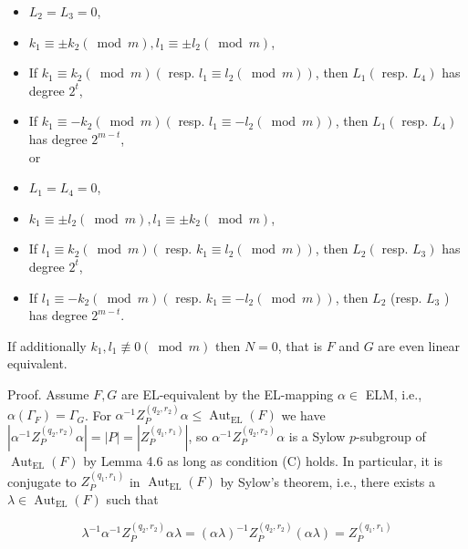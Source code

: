 \documentclass[10pt]{article}
\begin{document}
\begin{itemize}
  \item $L_{2}=L_{3}=0$,
  \item $k_{1} \equiv \pm k_{2}(\bmod m), l_{1} \equiv \pm l_{2}(\bmod m)$,
  \item If $k_{1} \equiv k_{2}(\bmod m)\left(\right.$ resp. $\left.l_{1} \equiv l_{2}(\bmod m)\right)$, then $L_{1}\left(\right.$ resp. $\left.L_{4}\right)$ has degree $2^{t}$,
  \item If $k_{1} \equiv-k_{2}(\bmod m)\left(\right.$ resp. $\left.l_{1} \equiv-l_{2}(\bmod m)\right)$, then $L_{1}\left(\right.$ resp. $\left.L_{4}\right)$ has degree $2^{m-t}$,\\
or
  \item $L_{1}=L_{4}=0$,
  \item $k_{1} \equiv \pm l_{2}(\bmod m), l_{1} \equiv \pm k_{2}(\bmod m)$,
  \item If $l_{1} \equiv k_{2}(\bmod m)\left(\right.$ resp. $\left.k_{1} \equiv l_{2}(\bmod m)\right)$, then $L_{2}\left(\right.$ resp. $\left.L_{3}\right)$ has degree $2^{t}$,
  \item If $l_{1} \equiv-k_{2}(\bmod m)\left(\right.$ resp. $\left.k_{1} \equiv-l_{2}(\bmod m)\right)$, then $L_{2}$ (resp. $L_{3}$ ) has degree $2^{m-t}$.
\end{itemize}

If additionally $k_{1}, l_{1} \not \equiv 0(\bmod m)$ then $N=0$, that is $F$ and $G$ are even linear equivalent.

Proof. Assume $F, G$ are EL-equivalent by the EL-mapping $\alpha \in$ ELM, i.e., $\alpha\left(\Gamma_{F}\right)=\Gamma_{G}$. For $\alpha^{-1} Z_{P}^{\left(q_{2}, r_{2}\right)} \alpha \leqslant \operatorname{Aut}_{\mathrm{EL}}(F)$ we have $\left|\alpha^{-1} Z_{P}^{\left(q_{2}, r_{2}\right)} \alpha\right|=|P|=\left|Z_{P}^{\left(q_{1}, r_{1}\right)}\right|$, so $\alpha^{-1} Z_{P}^{\left(q_{2}, r_{2}\right)} \alpha$ is a Sylow $p$-subgroup of $\operatorname{Aut}_{\mathrm{EL}}(F)$ by Lemma 4.6 as long as condition (C) holds. In particular, it is conjugate to $Z_{P}^{\left(q_{1}, r_{1}\right)}$ in $\operatorname{Aut}_{\mathrm{EL}}(F)$ by Sylow's theorem, i.e., there exists a $\lambda \in \operatorname{Aut}_{\mathrm{EL}}(F)$ such that


\begin{equation*}
\lambda^{-1} \alpha^{-1} Z_{P}^{\left(q_{2}, r_{2}\right)} \alpha \lambda=(\alpha \lambda)^{-1} Z_{P}^{\left(q_{2}, r_{2}\right)}(\alpha \lambda)=Z_{P}^{\left(q_{1}, r_{1}\right)} \tag{4.2}
\end{equation*}
\end{document}
